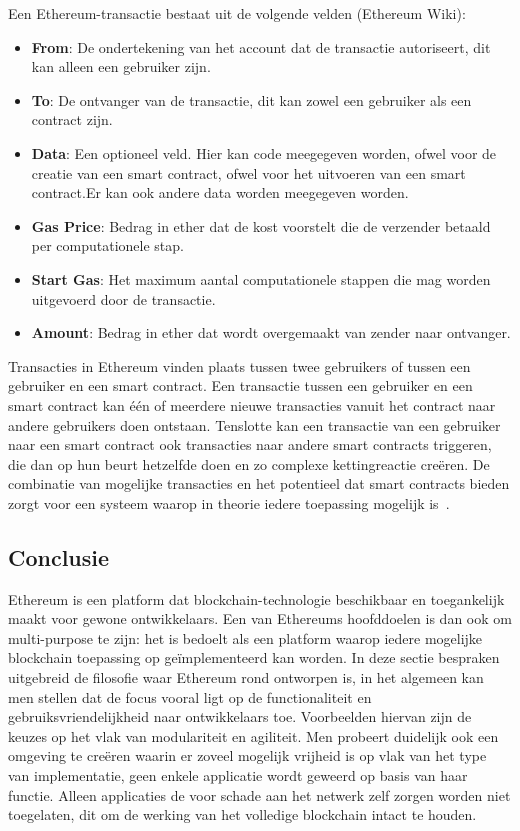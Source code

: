 		Een Ethereum-transactie bestaat uit de volgende velden (Ethereum Wiki):
		\begin{itemize}
			\item \textbf{From}: De ondertekening van het account dat de transactie autoriseert, dit kan alleen een gebruiker zijn.
			\item \textbf{To}: De ontvanger van de transactie, dit kan zowel een gebruiker als een contract zijn. 
			\item \textbf{Data}: Een optioneel veld. Hier  kan code meegegeven worden, ofwel voor de creatie van een smart contract, ofwel voor het uitvoeren van een smart contract.Er kan ook andere data worden meegegeven worden.
			\item \textbf{Gas Price}: Bedrag in ether dat de kost voorstelt die de verzender betaald per computationele stap.
			\item \textbf{Start Gas}: Het maximum aantal computationele stappen die mag worden uitgevoerd door de transactie.
			\item \textbf{Amount}: Bedrag in ether dat wordt overgemaakt van zender naar ontvanger.
		\end{itemize}	
		Transacties in Ethereum vinden plaats tussen twee gebruikers of tussen een gebruiker en een smart contract. Een transactie tussen een gebruiker en een smart contract kan één of meerdere nieuwe transacties vanuit het contract naar andere gebruikers doen ontstaan. Tenslotte kan een transactie van een gebruiker naar een smart contract ook transacties naar andere smart contracts triggeren, die dan op hun beurt hetzelfde doen en zo complexe kettingreactie creëren. De combinatie van mogelijke transacties en het potentieel dat smart contracts bieden zorgt voor een systeem waarop in theorie iedere toepassing mogelijk is~\autocite{Wood2017}. 
	\subsection{Conclusie}
		 Ethereum is een platform dat blockchain-technologie beschikbaar en toegankelijk maakt voor gewone ontwikkelaars. Een van Ethereums hoofddoelen is dan ook om multi-purpose te zijn: het is bedoelt als een platform waarop iedere mogelijke blockchain toepassing op geïmplementeerd kan worden. In deze sectie bespraken uitgebreid de filosofie waar Ethereum rond ontworpen is, in het algemeen kan men stellen dat de focus vooral ligt op de functionaliteit en gebruiksvriendelijkheid naar ontwikkelaars toe. Voorbeelden hiervan zijn de keuzes op het vlak van modulariteit en agiliteit. Men probeert duidelijk ook een omgeving te creëren waarin er zoveel mogelijk vrijheid is op vlak van het type van implementatie, geen enkele applicatie wordt geweerd op basis van haar functie. Alleen applicaties de voor schade aan het netwerk zelf zorgen worden niet toegelaten, dit om de werking van het volledige blockchain intact te houden. 
		
